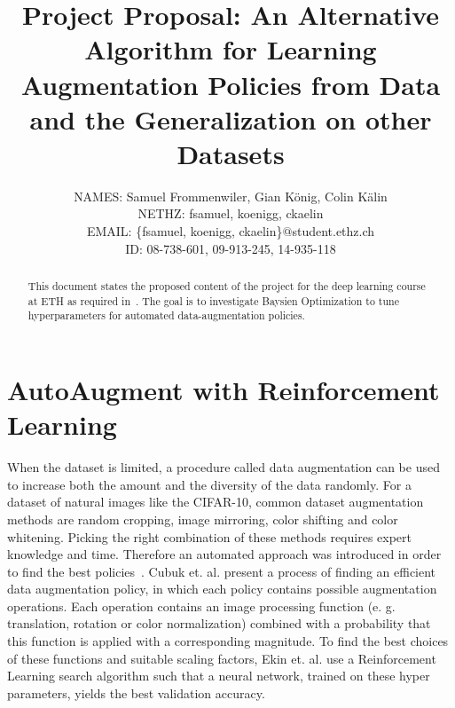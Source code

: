 \documentclass[10pt,twocolumn,letterpaper]{article}
\begin{document}
\title{Project Proposal: An Alternative Algorithm for Learning Augmentation Policies from Data and the Generalization on other Datasets}

\author{
    	\small{NAMES: Samuel Frommenwiler, Gian K\"onig, Colin K\"alin} \\
   	\small{NETHZ: fsamuel, koenigg, ckaelin}\\
	\small{EMAIL: \{fsamuel, koenigg, ckaelin\}$@$student.ethz.ch}\\
    	\small{ID: 08-738-601, 09-913-245, 14-935-118}
}

\maketitle

\begin{abstract}
   This document states the proposed content of the project for the deep learning course at ETH as required in~\cite{DL18}. The goal is to investigate Baysien Optimization to tune hyperparameters for automated data-augmentation policies.
\end{abstract}

\section{AutoAugment with Reinforcement Learning}
When the dataset is limited, a procedure called data augmentation can be used to increase both the amount and the diversity of the data randomly. For a dataset of natural images like the CIFAR-10, common dataset augmentation methods are random cropping, image mirroring, color shifting and color whitening. Picking the right combination of these methods requires expert knowledge and time. Therefore an automated approach was introduced in order to find the best policies~\cite{Ekin}. Cubuk et. al. present a process of finding an efficient data augmentation policy, in which each policy contains possible augmentation operations. Each operation contains an image processing function (e. g. translation, rotation or color normalization) combined with a probability that this function is applied with a corresponding magnitude. To find the best choices of these functions and suitable scaling factors, Ekin et. al. use a Reinforcement Learning search algorithm such that a neural network, trained on these hyper parameters, yields the best validation accuracy.
\end{document}
